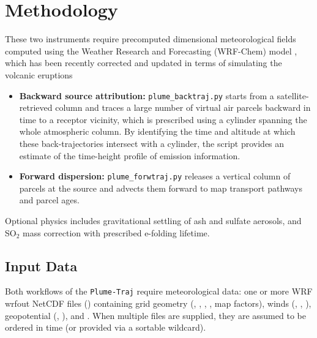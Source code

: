 \documentclass[11pt]{article}
\begin{document}
\section{Methodology}
These two instruments require precomputed dimensional meteorological fields computed using the Weather Research and Forecasting (WRF-Chem) model \citep{skamarock2005description,grell2005fully}, which has been recently corrected and updated in terms of simulating the volcanic eruptions \citep{ukhov2025enhancing}

\begin{itemize}
  \item \textbf{Backward source attribution:} \texttt{plume\_backtraj.py} starts from a satellite-retrieved column and traces a large number of virtual air parcels backward in time to a receptor vicinity, which is prescribed using a cylinder spanning the whole atmospheric column. By identifying the time and altitude at which these back-trajectories intersect with a cylinder, the script provides an estimate of the time-height profile of emission information.
  \item \textbf{Forward dispersion:} \texttt{plume\_forwtraj.py} releases a vertical column of parcels at the source and advects them forward to map transport pathways and parcel ages.
\end{itemize}
Optional physics includes gravitational settling of ash and sulfate aerosols, and SO$_2$ mass correction with prescribed e-folding lifetime.

\subsection{Input Data}
Both workflows of the \texttt{Plume-Traj} require meteorological data: one or more WRF wrfout NetCDF files () containing grid geometry (, , , , map factors), winds (, , ), geopotential (, ), and . When multiple files are supplied, they are assumed to be ordered in time (or provided via a sortable wildcard).
\end{document}
